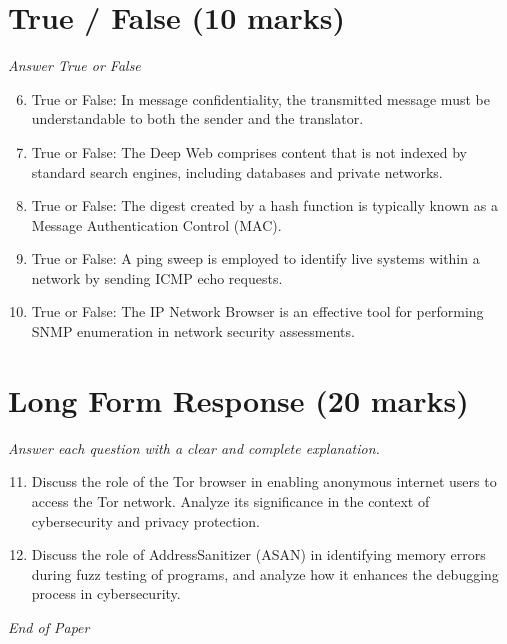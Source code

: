 \documentclass[12pt]{article}
\begin{document}
\section*{True / False (10 marks)}
\textit{Answer True or False}
\begin{enumerate}[label=\arabic*.]
\setcounter{enumi}{5}
\item True or False: In message confidentiality, the transmitted message must be understandable to both the sender and the translator.
\item True or False: The Deep Web comprises content that is not indexed by standard search engines, including databases and private networks.
\item True or False: The digest created by a hash function is typically known as a Message Authentication Control (MAC).
\item True or False: A ping sweep is employed to identify live systems within a network by sending ICMP echo requests.
\item True or False: The IP Network Browser is an effective tool for performing SNMP enumeration in network security assessments.
\end{enumerate}

\section*{Long Form Response (20 marks)}
\textit{Answer each question with a clear and complete explanation.}
\begin{enumerate}[label=\arabic*.]
\setcounter{enumi}{10}
\item Discuss the role of the Tor browser in enabling anonymous internet users to access the Tor network. Analyze its significance in the context of cybersecurity and privacy protection.
\item Discuss the role of AddressSanitizer (ASAN) in identifying memory errors during fuzz testing of programs, and analyze how it enhances the debugging process in cybersecurity.
\end{enumerate}

\vfill
\noindent\textit{End of Paper}
\end{document}
